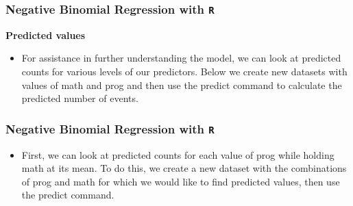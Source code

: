 \documentclass[00-GLMregslides.tex]{subfiles}
\begin{document}
\begin{frame}[fragile]
	\frametitle{Negative Binomial Regression with \texttt{R} }
	\Large
	
	\textbf{Predicted values}
	\begin{itemize}
\item	For assistance in further understanding the model, we can look at predicted counts for various levels of our predictors. Below we create new datasets with values of math and prog and then use the predict command to calculate the predicted number of events.
\end{itemize}
\end{frame}
\begin{frame}[fragile]
	\frametitle{Negative Binomial Regression with \texttt{R} }
	\Large
	
	\begin{itemize}
\item	First, we can look at predicted counts for each value of prog while holding math at its mean. To do this, we create a new dataset with the combinations of prog and math for which we would like to find predicted values, then use the predict command.
\end{itemize}
\end{frame}
\end{document}

